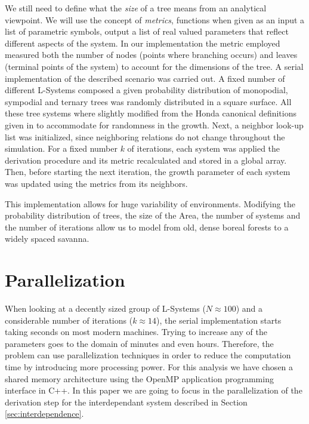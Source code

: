 \documentclass[letterpaper,twoside,11pt]{article}
\begin{document}
\begin{multicols}{2}
 We still need to define what the \emph{size} of a tree means from an analytical viewpoint. We will use the concept of \emph{metrics}, functions when given as an input a list of parametric symbols, output a list of real valued parameters that reflect different aspects of the system. In our implementation the metric employed measured both the number of nodes (points where branching occurs) and leaves (terminal points of the system) to account for the dimensions of the tree.
\vfill
\columnbreak
 A serial implementation of the described scenario was carried out\footnotemark. A fixed number of different L-Systems composed a given probability distribution of monopodial, sympodial and ternary trees was randomly distributed in a square surface. All these tree systems where slightly modified from the Honda canonical definitions given in \cite{Prusinkiewicz:1996:ABP:235579} to accommodate for randomness in the growth. Next, a neighbor look-up list was initialized, since neighboring relations do not change throughout the simulation. For a fixed number $k$ of iterations, each system was applied the derivation procedure and its metric recalculated and stored in a global array. Then, before starting the next iteration, the growth parameter of each system was updated using the metrics from its neighbors.

 This implementation allows for huge variability of environments. Modifying the probability distribution of trees, the size of the Area, the number of systems and the number of iterations allow us to model from old, dense boreal forests to a widely spaced savanna.



\section{Parallelization} %
\label{sec:parallelization}

When looking at a decently sized group of L-Systems ($N \approx 100$) and a considerable number of iterations ($k \approx 14$), the serial implementation starts taking seconds on most modern machines. Trying to increase any of the parameters goes to the domain of minutes and even hours. Therefore, the problem can use parallelization techniques in order to reduce the computation time by introducing more processing power. For this analysis we have chosen a shared memory architecture using the OpenMP application programming interface in C++. In this paper we are going to focus in the parallelization of the derivation step for the interdependant system described in Section \ref{sec:interdependence}.


\end{multicols}
\end{document}
